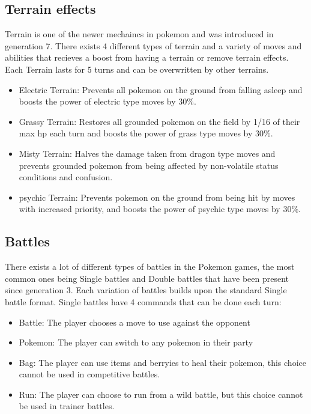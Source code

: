 \subsection{Terrain effects}
Terrain is one of the newer mechaincs in pokemon and was introduced in generation 7. There exists 4 different types of terrain and a variety of moves and abilities
that recieves a boost from having a terrain or remove terrain effects. Each Terrain lasts for 5 turns and can be overwritten by other terrains. \cite{Terrain}
\begin{itemize}
  \item Electric Terrain: Prevents all pokemon on the ground from falling asleep and boosts the power of electric type moves by 30\%.
  \item Grassy Terrain: Restores all grounded pokemon on the field by 1/16 of their max hp each turn and boosts the power of grass type moves by 30\%.
  \item Misty Terrain: Halves the damage taken from dragon type moves and prevents grounded pokemon from being affected by non-volatile status conditions and 
    confusion.
  \item psychic Terrain: Prevents pokemon on the ground from being hit by moves with increased priority, and boosts the power of psychic type moves by 30\%.
\end{itemize}

\subsection{Battles}
There exists a lot of different types of battles in the Pokemon games, the most common ones being Single battles and Double battles that have been present 
since generation 3. Each variation of battles builds upon the standard Single battle format. Single battles have 4 commands that can be done each turn:
\cite{PokemonBattles}
\begin{itemize}
  \item Battle: The player chooses a move to use against the opponent
  \item Pokemon: The player can switch to any pokemon in their party 
  \item Bag: The player can use items and berryies to heal their pokemon, this choice cannot be used in competitive battles.
  \item Run: The player can choose to run from a wild battle, but this choice cannot be used in trainer battles.
\end{itemize}
